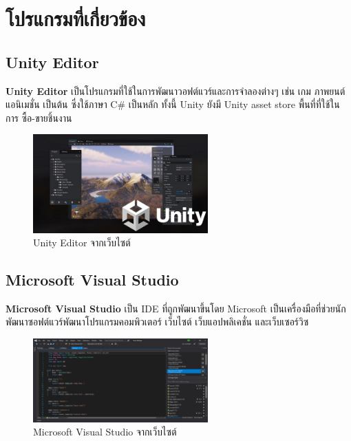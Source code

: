 \newpage
\section{โปรแกรมที่เกี่ยวข้อง}
\subsection{Unity Editor}
\subsubitem \textbf{Unity Editor} \cite{unity:program} เป็นโปรแกรมที่ใช้ในการพัฒนาวอฟต์แวร์และการจำลองต่างๆ เช่น เกม ภาพยนต์ แอนิเมชั่น เป็นต้น ซึ่งใช้ภาษา C$\#$ เป็นหลัก ทั้งนี้ Unity ยังมี Unity asset store พื้นที่ที่ใช้ในการ ซื้อ-ขายชิ้นงาน
\begin{figure}[h]
  \centering
  \includegraphics[width=0.6\textwidth, height=0.2\textheight]{Images/unity-engine-landscape-swimlane.png}
  \caption{Unity Editor จากเว็บไซต์}\label{Unity}
\end{figure}


\subsection{Microsoft Visual Studio}
\subsubitem \textbf{Microsoft Visual Studio} \cite{microsoft-visual-studios:program} เป็น IDE ที่ถูกพัฒนาขึ้นโดย Microsoft เป็นเครื่องมือที่ช่วยนักพัฒนาซอฟต์แวร์พัฒนาโปรแกรมคอมพิวเตอร์ เว็บไซต์ เว็บแอปพลิเคชั่น และเว็บเซอร์วิซ
\begin{figure}[h]
  \centering
  \includegraphics[width=0.6\textwidth, height=0.2\textheight]{Images/python-development-cropped.jpg}
  \caption{Microsoft Visual Studio จากเว็บไซต์}\label{Microsoft}
\end{figure}


